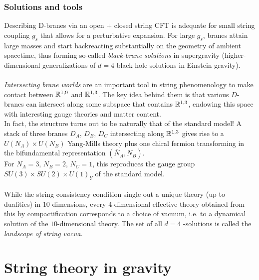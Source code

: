 \subsubsection{Solutions and tools}
Describing D-branes via an open $+$ closed string CFT is adequate for small string coupling $g_s$ that allows for a perturbative expansion. For large $g_s$, branes attain large masses and start backreacting substantially on the geometry of ambient spacetime, thus forming so-called \emph{black-brane solutions} in supergravity (higher-dimensional generalizations of $d=4$ black hole solutions in Einstein gravity).\\
\\
\emph{Intersecting brane worlds} are an important tool in string phenomenology to make contact between $\mathbb{R}^{1,9}$ and $\mathbb{R}^{1,3}$. The key idea behind them is that various $D$-branes can intersect along some subspace that contains $\mathbb{R}^{1,3}$, endowing this space with interesting gauge theories and matter content. \\
In fact, the structure turns out to be naturally that of the standard model!
A stack of three branes $D_A$, $D_B$, $D_C$ intersecting along $\mathbb{R}^{1,3}$ gives rise to a $U(N_A) \times U(N_B)$ Yang-Mills theory plus one chiral fermion transforming in the bifundamental representation $(\bar{N}_A,N_B)$.\\
For $N_A=3$, $N_B=2$, $N_C=1$, this reproduces the gauge group $SU(3)\times SU(2)\times U(1)_Y$ of the standard model.\\
\\
While the string consistency condition single out a unique theory (up to dualities) in $10$ dimensions, every $4$-dimensional effective theory obtained from this by compactification corresponds to a choice of vacuum, i.e. to a dynamical solution of the $10$-dimensional theory. The set of all $d=4$ -solutions is called the \emph{landscape of string vacua.}







\section{String theory in gravity}

